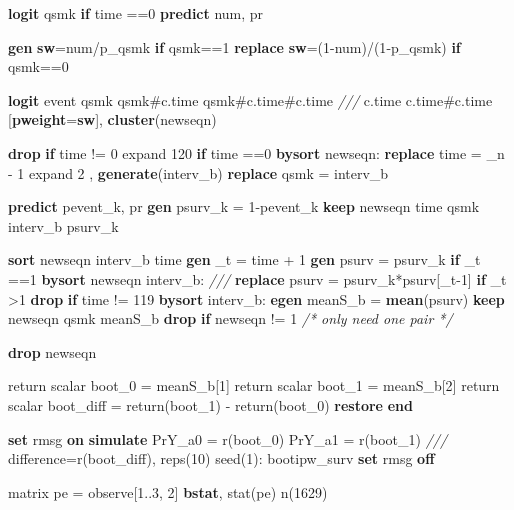 \documentclass[
  10pt,
]{book}
\newenvironment{Shaded}{\begin{snugshade}}{\end{snugshade}}
\newcommand{\CommentTok}[1]{\textcolor[rgb]{0.56,0.35,0.01}{\textit{#1}}}
\newcommand{\DataTypeTok}[1]{\textcolor[rgb]{0.13,0.29,0.53}{#1}}
\newcommand{\DecValTok}[1]{\textcolor[rgb]{0.00,0.00,0.81}{#1}}
\newcommand{\FunctionTok}[1]{\textcolor[rgb]{0.00,0.00,0.00}{#1}}
\newcommand{\KeywordTok}[1]{\textcolor[rgb]{0.13,0.29,0.53}{\textbf{#1}}}
\newcommand{\NormalTok}[1]{#1}
\begin{document}
\begin{Shaded}
\begin{Highlighting}[]
\KeywordTok{logit}\NormalTok{ qsmk }\KeywordTok{if}\NormalTok{ time ==0 }
\KeywordTok{predict}\NormalTok{ num, pr}

\KeywordTok{gen} \KeywordTok{sw}\NormalTok{=num/p\_qsmk }\KeywordTok{if}\NormalTok{ qsmk==1}
\KeywordTok{replace} \KeywordTok{sw}\NormalTok{=(1{-}num)/(1{-}p\_qsmk) }\KeywordTok{if}\NormalTok{ qsmk==0}

\KeywordTok{logit}\NormalTok{ event qsmk qsmk\#c.time qsmk\#c.time\#c.time }\CommentTok{///}
\NormalTok{  c.time c.time\#c.time [}\KeywordTok{pweight}\NormalTok{=}\KeywordTok{sw}\NormalTok{], }\KeywordTok{cluster}\NormalTok{(newseqn) }
    
\KeywordTok{drop} \KeywordTok{if}\NormalTok{ time != 0}
\NormalTok{expand 120 }\KeywordTok{if}\NormalTok{ time ==0 }
\KeywordTok{bysort}\NormalTok{ newseqn: }\KeywordTok{replace}\NormalTok{ time = }\DataTypeTok{\_n}\NormalTok{ {-} 1        }
\NormalTok{expand 2 , }\KeywordTok{generate}\NormalTok{(interv\_b) }
\KeywordTok{replace}\NormalTok{ qsmk = interv\_b }
        
\KeywordTok{predict}\NormalTok{ pevent\_k, pr}
\KeywordTok{gen}\NormalTok{ psurv\_k = 1{-}pevent\_k}
\KeywordTok{keep}\NormalTok{ newseqn time qsmk interv\_b psurv\_k }

\KeywordTok{sort}\NormalTok{ newseqn interv\_b time}
\KeywordTok{gen}\NormalTok{ \_t = time + 1}
\KeywordTok{gen}\NormalTok{ psurv = psurv\_k }\KeywordTok{if}\NormalTok{ \_t ==1       }
\KeywordTok{bysort}\NormalTok{ newseqn interv\_b: }\CommentTok{///}
  \KeywordTok{replace}\NormalTok{ psurv = psurv\_k*psurv[\_t{-}1] }\KeywordTok{if}\NormalTok{ \_t \textgreater{}1 }
\KeywordTok{drop} \KeywordTok{if}\NormalTok{ time != 119}
\KeywordTok{bysort}\NormalTok{ interv\_b: }\KeywordTok{egen}\NormalTok{ meanS\_b = }\KeywordTok{mean}\NormalTok{(psurv)}
\KeywordTok{keep}\NormalTok{ newseqn qsmk  meanS\_b }
\KeywordTok{drop} \KeywordTok{if}\NormalTok{ newseqn != 1  }\CommentTok{/* only need one pair */}
    
\KeywordTok{drop}\NormalTok{ newseqn        }
        
\FunctionTok{return} \FunctionTok{scalar}\NormalTok{ boot\_0 = meanS\_b[1]}
\FunctionTok{return} \FunctionTok{scalar}\NormalTok{ boot\_1 = meanS\_b[2]}
\FunctionTok{return} \FunctionTok{scalar}\NormalTok{  boot\_diff = }\FunctionTok{return}\NormalTok{(boot\_1) {-} }\FunctionTok{return}\NormalTok{(boot\_0)}
\KeywordTok{restore}
\KeywordTok{end}     

\KeywordTok{set} \DecValTok{rmsg} \KeywordTok{on}
\KeywordTok{simulate}\NormalTok{ PrY\_a0 = }\FunctionTok{r}\NormalTok{(boot\_0) PrY\_a1 = }\FunctionTok{r}\NormalTok{(boot\_1) }\CommentTok{///}
\NormalTok{  difference=}\FunctionTok{r}\NormalTok{(boot\_diff), reps(10) }\DecValTok{seed}\NormalTok{(1): bootipw\_surv}
\KeywordTok{set} \DecValTok{rmsg} \KeywordTok{off} 
 
\FunctionTok{matrix}\NormalTok{ pe = observe[1..3, 2]\textquotesingle{}}
\KeywordTok{bstat}\NormalTok{, stat(pe) n(1629)}
\end{Highlighting}
\end{Shaded}
\end{document}

